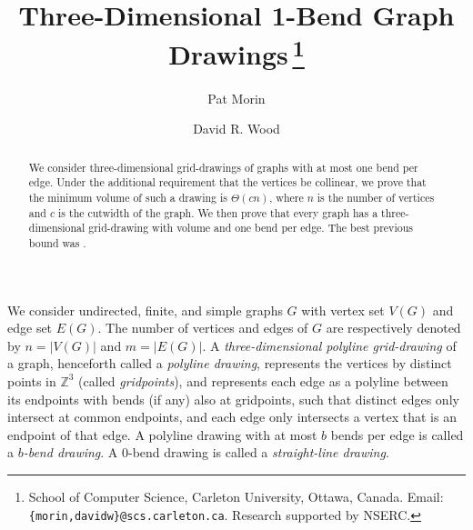 \documentclass[10pt,twocolumn]{article}
\begin{document}
\title{\textbf{Three-Dimensional 1-Bend Graph Drawings}\,\thanks{School of
Computer Science, Carleton University, Ottawa, Canada.  Email:
\texttt{\{morin,davidw\}@scs.carleton.ca}. Research supported by NSERC.}}

\author{Pat Morin \and  David R. Wood}
\date{}

\maketitle

\begin{abstract} We consider three-dimensional  grid-drawings of graphs with at
most one bend per edge.  Under the additional requirement that the vertices be
collinear, we prove that the minimum volume of such a drawing is $\Theta(cn)$,
where $n$ is the number of vertices and $c$ is the cutwidth of the graph. We
then prove  that every graph has a  three-dimensional  grid-drawing with
 volume and one bend per edge. The best previous bound was
. \end{abstract}



We consider  undirected, finite, and simple graphs $G$ with  vertex set $V(G)$
and edge set $E(G)$. The number of vertices and edges of $G$ are respectively
denoted by $n=|V(G)|$ and $m=|E(G)|$. A \emph{three-dimensional polyline
grid-drawing} of a graph, henceforth called a \emph{polyline drawing},
represents the vertices by distinct points in $\mathbb{Z}^3$ (called
\emph{gridpoints}), and represents each edge as a polyline between its
endpoints with bends (if any) also at gridpoints, such that distinct edges only
intersect at common endpoints, and each edge only intersects a vertex that is
an endpoint of that edge. A polyline drawing with at most $b$ bends per edge is
called a \emph{$b$-bend drawing}. A $0$-bend drawing is called a
\emph{straight-line drawing}. 
\end{document}
